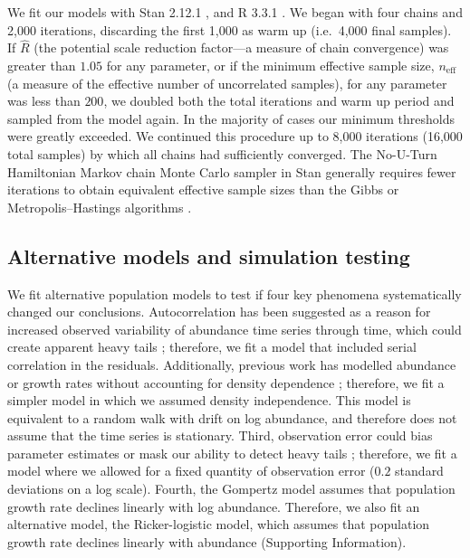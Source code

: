 \documentclass[9pt,twocolumn,twoside]{pnas-new}
\begin{document}
{We fit our models with Stan 2.12.1 \cite{hoffman2014, stan-manual2015, carpenter2016}, and R
3.3.1 \cite{r2015}. We began with four chains and 2,000 iterations, discarding
the first 1,000 as warm up (i.e.~4,000 final samples). If \(\hat{R}\) (the
potential scale reduction factor---a measure of chain convergence) was greater
than \(1.05\) for any parameter, or if the minimum effective sample size,
\(n_\mathrm{eff}\) (a measure of the effective number of uncorrelated samples),
for any parameter was less than \(200\), we doubled both the total iterations
and warm up period and sampled from the model again.
In the majority of cases our minimum thresholds were
greatly exceeded. We continued this procedure up to 8,000 iterations (16,000
total samples) by which all chains had sufficiently converged.
The No-U-Turn Hamiltonian Markov chain Monte Carlo sampler in Stan generally
requires fewer iterations to obtain equivalent effective sample sizes than the
Gibbs or Metropolis--Hastings algorithms \cite{stan-manual2015}.

\subsection{Alternative models and simulation testing}
We fit alternative population models to test if four key phenomena
systematically changed our conclusions. Autocorrelation has been suggested as
a reason for increased observed variability of abundance time series through
time, which could create apparent heavy tails \citep{inchausti2002};
therefore, we fit a model that included serial correlation in the residuals.
Additionally, previous work has modelled abundance or growth rates without
accounting for density dependence \citep{halley2002,segura2013}; therefore, we
fit a simpler model in which we assumed density independence.
This model is equivalent to a random walk with drift
on log abundance, and therefore does not assume
that the time series is stationary.
Third, observation error could bias parameter estimates \citep{knape2012} or mask our
ability to detect heavy tails \citep{ward2007}; therefore, we fit a model
where we allowed for a fixed quantity of observation error ($0.2$ standard
deviations on a log scale). Fourth, the Gompertz model assumes that
population growth rate declines linearly with log abundance. Therefore, we
also fit an alternative model, the Ricker-logistic model, which assumes that
population growth rate declines linearly with abundance (Supporting Information).

}
\end{document}
